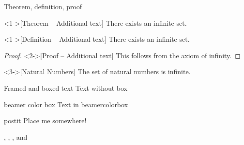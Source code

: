 \begin{frame}{Theorem, definition, proof}
  \begin{theorem}<1->[Theorem -- Additional text]
  There exists an infinite set.
  \end{theorem}
  \begin{definition}<1->[Definition -- Additional text]
  There exists an infinite set.
  \end{definition}
  \begin{proof}<2->[Proof -- Additional text]
  This follows from the axiom of infinity.
  \end{proof}
  \begin{example}<3->[Natural Numbers]
  The set of natural numbers is infinite.
  \end{example}
\end{frame}




\begin{frame}{Framed and boxed text}
  Text without box
  \begin{beamercolorbox}{beamer color box}
    Text in beamercolorbox
  \end{beamercolorbox}
  
  \begin{beamercolorbox}[sep=1em,wd=5cm]{postit}
    Place me somewhere!
  \end{beamercolorbox}
  
  , , , and 
\end{frame}



